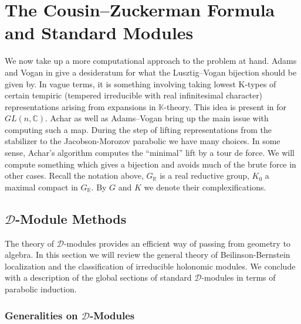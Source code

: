 \documentclass[letterpaper,twosided,11pt]{article}
\theoremstyle{plain}
\theoremstyle{definition}
\theoremstyle{remark}
\newcommand{\C}{\mathbb{C}}
\newcommand{\R}{\mathbb{R}}
\begin{document}
 












\section{The Cousin--Zuckerman Formula and Standard Modules}

We now take
up a more computational approach to the problem at hand.  Adams and
Vogan in
\cite{AdamsVogan2021} give a desideratum for what the Lusztig--Vogan
bijection should be given by.  In vague terms, it is something involving
taking lowest K-types of certain tempiric (tempered irreducible with
real infinitesimal character) representations arising from expansions in
$ \mathbb{K} $-theory.  This idea is present in
\cite{Achar2001} for $ GL(n,\C). $ Achar as well as Adams--Vogan bring
up the main issue with computing such a map.  During the step of lifting
representations from the stabilizer to the Jacobson-Morozov parabolic we
have many choices.  In some sense, Achar's algorithm computes the
``minimal'' lift by a tour de force.  We will compute something which
gives a bijection and avoids much of the brute force in other cases.
Recall the notation above, $ G_\R $ is a real reductive group, $ K_0 $ a
maximal compact in $ G_\R. $ By $ G $ and $ K $ we denote their
complexifications.


\subsection{$\mathcal{D}$-Module Methods}

The theory of $\mathcal{D}$-modules provides an efficient way 
of passing from geometry to algebra. In this section we will review 
the general theory of Beilinson-Bernstein localization and the classification
of irreducible holonomic modules. We conclude with a description of the global 
sections of standard $\mathcal{D}$-modules in terms of 
parabolic induction. 



\subsubsection{Generalities on $ \mathcal{D} $-Modules}
\end{document}
